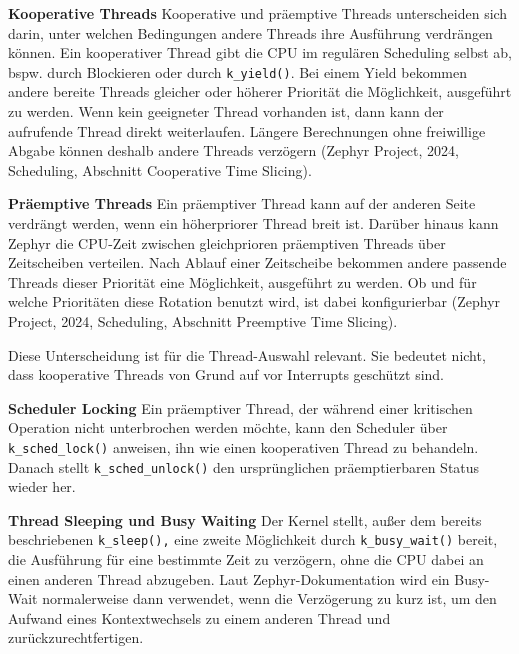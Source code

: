 \textbf{Kooperative Threads }Kooperative und pr{\"a}emptive Threads unterscheiden sich darin, unter welchen Bedingungen andere Threads ihre Ausf{\"u}hrung verdr{\"a}ngen k{\"o}nnen. Ein kooperativer Thread gibt die CPU im regul{\"a}ren Scheduling selbst ab, bspw. durch Blockieren oder durch \lstinline[style=codeinline]|k_yield()|. Bei einem Yield bekommen andere bereite Threads gleicher oder h{\"o}herer Priorit{\"a}t die M{\"o}glichkeit, ausgef{\"u}hrt zu werden. Wenn kein geeigneter Thread vorhanden ist, dann kann der aufrufende Thread direkt weiterlaufen. L{\"a}ngere Berechnungen ohne freiwillige Abgabe k{\"o}nnen deshalb andere Threads verz{\"o}gern (Zephyr Project, 2024, \glqq{}Scheduling\grqq{}, Abschnitt \glqq{}Cooperative Time Slicing\grqq{}).

\textbf{Pr{\"a}emptive Threads }Ein pr{\"a}emptiver Thread kann auf der anderen Seite verdr{\"a}ngt werden, wenn ein h{\"o}herpriorer Thread breit ist. Dar{\"u}ber hinaus kann Zephyr die CPU-Zeit zwischen gleichprioren pr{\"a}emptiven Threads {\"u}ber Zeitscheiben verteilen. Nach Ablauf einer Zeitscheibe bekommen andere passende Threads dieser Priorit{\"a}t eine M{\"o}glichkeit, ausgef{\"u}hrt zu werden. Ob und f{\"u}r welche Priorit{\"a}ten diese Rotation benutzt wird, ist dabei konfigurierbar (Zephyr Project, 2024, \glqq{}Scheduling\grqq{}, Abschnitt \glqq{}Preemptive Time Slicing\grqq{}).

Diese Unterscheidung ist f{\"u}r die Thread-Auswahl relevant. Sie bedeutet nicht, dass kooperative Threads von Grund auf vor Interrupts gesch{\"u}tzt sind.

\textbf{Scheduler Locking }Ein pr{\"a}emptiver Thread, der w{\"a}hrend einer kritischen Operation nicht unterbrochen werden m{\"o}chte, kann den Scheduler {\"u}ber \lstinline[style=codeinline]|k_sched_lock()| anweisen, ihn wie einen kooperativen Thread zu behandeln. Danach stellt \lstinline[style=codeinline]|k_sched_unlock()| den urspr{\"u}nglichen pr{\"a}emptierbaren Status wieder her.

\textbf{Thread Sleeping und Busy Waiting }Der Kernel stellt, au{\ss}er dem bereits beschriebenen \lstinline[style=codeinline]|k_sleep(),| eine zweite M{\"o}glichkeit durch \lstinline[style=codeinline]|k_busy_wait()| bereit, die Ausf{\"u}hrung f{\"u}r eine bestimmte Zeit zu verz{\"o}gern, ohne die CPU dabei an einen anderen Thread abzugeben. Laut Zephyr-Dokumentation wird ein Busy-Wait normalerweise dann verwendet, wenn die Verz{\"o}gerung zu kurz ist, um den Aufwand eines Kontextwechsels zu einem anderen Thread und zur{\"u}ckzurechtfertigen.


